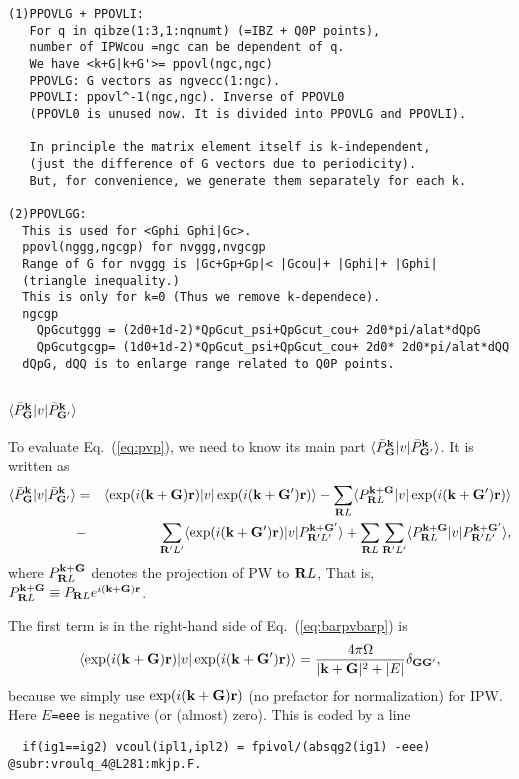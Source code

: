 \documentclass[a4paper,10pt,epsf,fleqn]{article}
\newcommand{\bfk}{{\bf k}}
\newcommand{\bfr}{{\bf r}}
\newcommand{\bfG}{{\bf G}}
\newcommand{\bfR}{{\bf R}}
\newcommand{\req}[1]{\mbox{Eq.~(\ref{#1})}}
\begin{document}
\begin{verbatim}
(1)PPOVLG + PPOVLI:
   For q in qibze(1:3,1:nqnumt) (=IBZ + Q0P points), 
   number of IPWcou =ngc can be dependent of q.
   We have <k+G|k+G'>= ppovl(ngc,ngc) 
   PPOVLG: G vectors as ngvecc(1:ngc).
   PPOVLI: ppovl^-1(ngc,ngc). Inverse of PPOVL0
   (PPOVL0 is unused now. It is divided into PPOVLG and PPOVLI).

   In principle the matrix element itself is k-independent,
   (just the difference of G vectors due to periodicity).
   But, for convenience, we generate them separately for each k.

(2)PPOVLGG: 
  This is used for <Gphi Gphi|Gc>.
  ppovl(nggg,ngcgp) for nvggg,nvgcgp
  Range of G for nvggg is |Gc+Gp+Gp|< |Gcou|+ |Gphi|+ |Gphi| 
  (triangle inequality.)
  This is only for k=0 (Thus we remove k-dependece).
  ngcgp 
    QpGcutggg = (2d0+1d-2)*QpGcut_psi+QpGcut_cou+ 2d0*pi/alat*dQpG 
    QpGcutgcgp= (1d0+1d-2)*QpGcut_psi+QpGcut_cou+ 2d0* 2d0*pi/alat*dQQ
  dQpG, dQQ is to enlarge range related to Q0P points.

\end{verbatim}


\subsection{$\langle \bar{P}^\bfk_\bfG |v| \bar{P}^\bfk_{\bfG'} \rangle$}
To evaluate \req{eq:pvp}, we need to know 
its main part $\langle \bar{P}^\bfk_\bfG |v| \bar{P}^\bfk_{\bfG'} \rangle$. It is written as
\begin{eqnarray}
\langle \bar{P}^\bfk_\bfG |v| \bar{P}^\bfk_{\bfG'} \rangle
&=&\langle \exp(i(\bfk+\bfG)\bfr) |v| \exp(i(\bfk+\bfG')\bfr) \rangle
-\sum_{\bfR{L}} 
\langle P^{\bfk+\bfG}_{\bfR{L}}|v| \exp(i(\bfk+\bfG')\bfr) \rangle \nonumber \\
&-&\sum_{\bfR'{L'}} 
\langle \exp(i(\bfk+\bfG')\bfr) |v| P^{\bfk+\bfG'}_{\bfR'{L'}}\rangle
+\sum_{\bfR{L}} \sum_{\bfR'{L'}} 
\langle P^{\bfk+\bfG}_{\bfR{L}}|v|P^{\bfk+\bfG'}_{\bfR'{L'}} \rangle,
\label{eq:barpvbarp}
\end{eqnarray}
where $P^{\bfk+\bfG}_{\bfR{L}}$ denotes 
the projection of PW to ${\bfR{L}}$,
That is, 
$P^{\bfk+\bfG}_{\bfR{L}} \equiv 
{P}_{\bfR{L}} e^{i ({\bf k+ G}){\bf r}}$.

The first term is in the right-hand side of \req{eq:barpvbarp} is
\begin{eqnarray}
\langle \exp(i(\bfk+\bfG)\bfr) |v| \exp(i(\bfk+\bfG')\bfr) \rangle
=\frac{4 \pi \Omega}{|\bfk+\bfG|^2+|E|} \delta_{\bfG\bfG'},
\label{eq:barpvbarp1st}
\end{eqnarray}
because we simply use $\exp(i(\bfk+\bfG)\bfr)$ 
(no prefactor for normalization) for IPW. 
Here $E$\verb!=eee! is negative (or (almost) zero). 
This is coded by a line 
\begin{verbatim}
  if(ig1==ig2) vcoul(ipl1,ipl2) = fpivol/(absqg2(ig1) -eee)
@subr:vroulq_4@L281:mkjp.F.
\end{verbatim}
\end{document}
